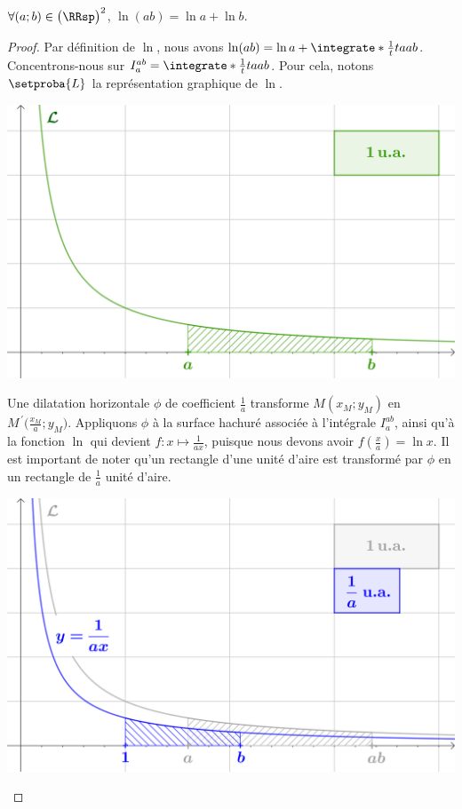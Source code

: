 \begin{fact}
	$\forall (a;b) \in \big( \RRsp \big)^2$,
	$\ln(a b) = \ln a + \ln b$.
\end{fact}


\begin{proof}
	Par définition de $\ln$, nous avons 
	$\ln(a b) = \ln a + \integrate*{\frac1t}{t}{a}{ab}$.
	Concentrons-nous sur $I_{a}^{ab} = \integrate*{\frac1t}{t}{a}{ab}$.
	Pour cela, notons $\setproba{L}$ la représentation graphique  de $\ln$.
	
	\begin{center}
		\includegraphics[scale=.5]{content/ln/func-eq-1.png}
	\end{center}

	Une dilatation horizontale $\phi$ de coefficient $\frac1a$ transforme $M(x_M ; y_M)$ en $M^{\,\prime}\big( \frac{x_M}{a} ; y_M)$. 
	Appliquons $\phi$ à la surface hachuré associée à l'intégrale $I_{a}^{ab}$, ainsi qu'à la fonction $\ln$ qui devient $f: x \mapsto \frac{1}{a x}$, puisque nous devons avoir $f(\frac{x}{a}) = \ln x$. 
	Il est important de noter qu'un rectangle d'une unité d'aire est transformé par $\phi$ en un rectangle de $\frac1a$ unité d'aire.

	\begin{center}
		\includegraphics[scale=.5]{content/ln/func-eq-2.png}
	\end{center}


\end{proof}
